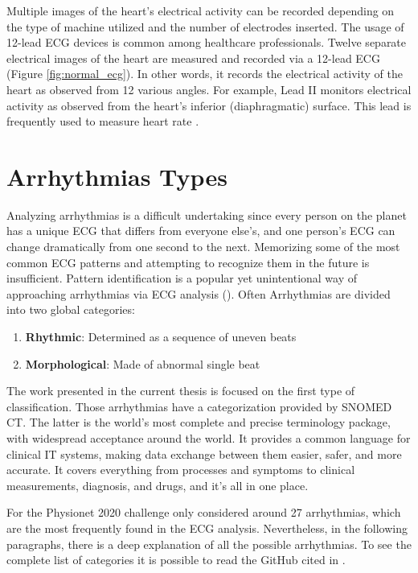 Multiple images of the heart's electrical activity can be recorded depending on the type of machine utilized and the number of electrodes inserted. The usage of 12-lead ECG devices is common among healthcare professionals. Twelve separate electrical images of the heart are measured and recorded via a 12-lead ECG (Figure \ref{fig:normal_ecg}). In other words, it records the electrical activity of the heart as observed from 12 various angles. For example, Lead II monitors electrical activity as observed from the heart's inferior (diaphragmatic) surface. This lead is frequently used to measure heart rate \cite{basic_arryth}.

\section{Arrhythmias Types} \label{arrhythmias_types}

Analyzing arrhythmias is a difficult undertaking since every person on the planet has a unique ECG that differs from everyone else's, and one person's ECG can change dramatically from one second to the next. Memorizing some of the most common ECG patterns and attempting to recognize them in the future is insufficient. Pattern identification is a popular yet unintentional way of approaching arrhythmias via ECG analysis (\cite{arryth_types}). Often Arrhythmias are divided into two global categories:

\begin{enumerate}
    \item \textbf{Rhythmic}: Determined as a sequence of uneven beats
    \item \textbf{Morphological}: Made of abnormal single beat
\end{enumerate}

The work presented in the current thesis is focused on the first type of classification. Those arrhythmias have a categorization provided by SNOMED CT. The latter is the world's most complete and precise terminology package, with widespread acceptance around the world. It provides a common language for clinical IT systems, making data exchange between them easier, safer, and more accurate. It covers everything from processes and symptoms to clinical measurements, diagnosis, and drugs, and it's all in one place.

For the Physionet 2020 challenge only considered around 27 arrhythmias, which are the most frequently found in the ECG analysis. Nevertheless, in the following paragraphs, there is a deep explanation of all the possible arrhythmias. To see the complete list of categories it is possible to read the GitHub cited in \cite{github_arrhythmias}.

